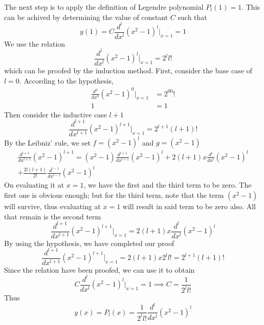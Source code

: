 \documentclass[../main.tex]{subfiles}
\begin{document}
The next step is to apply the definition of Legendre polynomial $P_l(1)=1$. This can be achived by determining the value of constant $C$ such that 
\begin{equation*}
    y(1)=C\frac{d^l}{dx^l} (x^2-1)^l\bigg|_{x=1}=1
\end{equation*}
We use the relation 
\begin{equation*}
    \frac{d^l}{dx^l}(x^2-1)^l\bigg|_{x=1}=2^ll!
\end{equation*}
which can be proofed by the induction method. First, consider the base case of $l=0$. According to the hypothesis,
\begin{align*}
    \frac{d^0}{dx^0}(x^2-1)^0\bigg|_{x=1}&=2^00!\\
    1&=1
\end{align*}
Then consider the inductive case $l+1$
\begin{equation*}
    \frac{d^{l+1}}{dx^{l+1}}(x^2-1)^{l+1}\bigg|_{x=1}=2^{l+1}(l+1)!
\end{equation*}
By the Leibniz' rule, we set $f=(x^2-1)^l$ and $g=(x^2-1)$
\begin{multline*}
    \frac{d^{l+1}}{dx^{l+1}}(x^2-1)^{l+1} =(x^2-1)\frac{d^{l+1}}{dx^{l+1}}(x^2-1)^l +2(l+1)x\frac{d^{l}}{dx^{l}}(x^2-1)^l \\
    +\frac{2l(l+1)}{2!}\frac{d^{l-1}}{dx^{l-1}}(x^2-1)^l
\end{multline*}
On evaluating it at $x=1$, we have the first and the third term to be zero. The first one is obvious enough; but for the third term, note that the term $(x^2-1)$ will survive, thus evaluating at $x=1$ will result in said term to be zero also. All that remain is the second term
\begin{equation*}
    \frac{d^{l+1}}{dx^{l+1}}(x^2-1)^{l+1}\bigg|_{x=1}=2(l+1)x\frac{d^{l}}{dx^{l}}(x^2-1)^l
\end{equation*}
By using the hypothesis, we have completed our proof
\begin{equation*}
    \frac{d^{l+1}}{dx^{l+1}}(x^2-1)^{l+1}\bigg|_{x=1}=2(l+1)x2^ll!=2^{l+1}(l+1)!
\end{equation*}
Since the relation have been proofed, we can use it to obtain 
\begin{equation*}
    C\frac{d^l}{dx^l} (x^2-1)^l\bigg|_{x=1}=1\implies C=\frac{1}{2^ll!}
\end{equation*}
Thus 
\begin{equation*}
    y(x)=P_l(x)=\frac{1}{2^ll!}\frac{d^l}{dx^l} (x^2-1)^l
\end{equation*}
\end{document}
